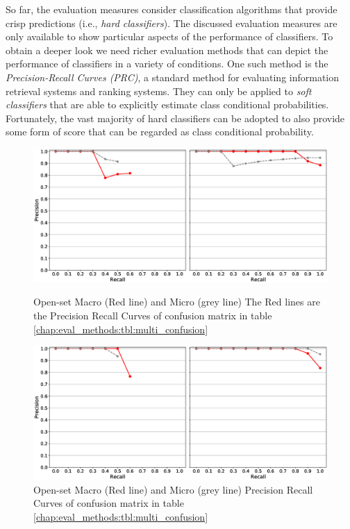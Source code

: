 So far, the evaluation measures consider classification algorithms that provide crisp predictions (i.e., \textit{hard classifiers}). The discussed evaluation measures are only available to show particular aspects of the performance of classifiers. To obtain a deeper look we need richer evaluation methods that can depict the performance of classifiers in a variety of conditions. One such method is the \textit{Precision-Recall Curves (PRC)}, a standard method for evaluating information retrieval systems and ranking systems. They can only be applied to \textit{soft classifiers} that are able to explicitly estimate class conditional probabilities. Fortunately, the vast majority of hard classifiers can be adopted to also provide some form of score that can be regarded as class conditional probability.


\begin{figure}[p]
	\begin{center}
    	\includegraphics[scale=0.38]{Figures/prc_macro_micro_count_noise.eps}
		\caption{Open-set Macro (Red line) and Micro (grey line) 
		The Red lines are the Precision Recall Curves of confusion matrix in table \ref{chap:eval_methods:tbl:multi_confusion}}
		\label{chap:eval_methods:fig:prc_noise}
	\end{center}

	\begin{center}
    	\includegraphics[scale=0.38]{Figures/prc_macro_micro.eps}
		\caption{Open-set Macro (Red line) and Micro (grey line) Precision Recall Curves of confusion matrix in table \ref{chap:eval_methods:tbl:multi_confusion}}
		\label{chap:eval_methods:fig:prc}
	\end{center}
\end{figure}


